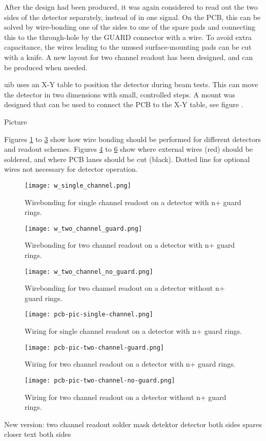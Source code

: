 \documentclass[../main/thesis.tex]{subfiles}
\begin{document}
After the design had been produced, it was again considered to read out the two sides of the detector separately, instead of in one signal. On the \gls{PCB}, this can be solved by wire-bonding one of the sides to one of the spare pads and connecting this to the through-hole by the GUARD connector with a wire. To avoid extra capacitance, the wires leading to the unused surface-mounting pads can be cut with a knife. A new layout for two channel readout has been designed, and can be produced when needed. 

\gls{uib} uses an X-Y table to position the detector during beam tests. This can move the detector in two dimensions with small, controlled steps. A mount was designed that can be used to connect the PCB to the X-Y table, see figure . 

Picture

Figures \ref{fig-wire-1-g} to \ref{fig-wire-2} show how wire bonding should be performed for different detectors and readout schemes. Figures \ref{fig-wiring-1-g} to \ref{fig-wiring-2} show where external wires (red) should be soldered, and where PCB lanes should be cut (black). Dotted line for optional wires not necessary for detector operation.

\begin{figure}%
	\centering
	\texttt{[image: w\_single\_channel.png]}
	\caption{Wirebonding for single channel readout on a detector with n+ guard rings.}
	\label{fig-wire-1-g} 
\end{figure}

\begin{figure}%
	\centering
	\texttt{[image: w\_two\_channel\_guard.png]}
	\caption{Wirebonding for two channel readout on a detector with n+ guard rings.}
	\label{fig-wire-2-g} 
\end{figure}

\begin{figure}%
	\centering
	\texttt{[image: w\_two\_channel\_no\_guard.png]}
	\caption{Wirebonding for two channel readout on a detector without n+ guard rings.}
	\label{fig-wire-2} 
\end{figure}

\begin{figure}%
	\centering
	\texttt{[image: pcb-pic-single-channel.png]}
	\caption{Wiring for single channel readout on a detector with n+ guard rings.}
	\label{fig-wiring-1-g} 
\end{figure}

\begin{figure}%
	\centering
	\texttt{[image: pcb-pic-two-channel-guard.png]}
	\caption{Wiring for two channel readout on a detector with n+ guard rings.}
	\label{fig-wiring-2-g} 
\end{figure}

\begin{figure}%
	\centering
	\texttt{[image: pcb-pic-two-channel-no-guard.png]}
	\caption{Wiring for two channel readout on a detector without n+ guard rings.}
	\label{fig-wiring-2} 
\end{figure}

New version:
two channel readout
solder mask detektor
detector both sides
spares closer
text both sides
\end{document}
